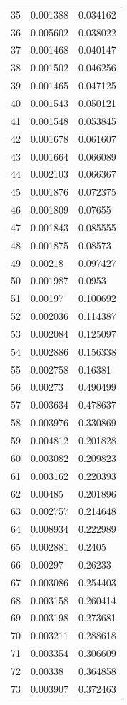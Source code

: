 \documentclass[runningheads]{llncs}
\begin{document}
\begin{longtable}{| p{} | p{} | p{} |}
35 & 0.001388 & 0.034162 \\
36 & 0.005602 & 0.038022 \\
37 & 0.001468 & 0.040147 \\
38 & 0.001502 & 0.046256 \\
39 & 0.001465 & 0.047125 \\
40 & 0.001543 & 0.050121 \\
41 & 0.001548 & 0.053845 \\
42 & 0.001678 & 0.061607 \\
43 & 0.001664 & 0.066089 \\
44 & 0.002103 & 0.066367 \\
45 & 0.001876 & 0.072375 \\
46 & 0.001809 & 0.07655 \\
47 & 0.001843 & 0.085555 \\
48 & 0.001875 & 0.08573 \\
49 & 0.00218 & 0.097427 \\
50 & 0.001987 & 0.0953 \\
51 & 0.00197 & 0.100692 \\
52 & 0.002036 & 0.114387 \\
53 & 0.002084 & 0.125097 \\
54 & 0.002886 & 0.156338 \\
55 & 0.002758 & 0.16381 \\
56 & 0.00273 & 0.490499 \\
57 & 0.003634 & 0.478637 \\
58 & 0.003976 & 0.330869 \\
59 & 0.004812 & 0.201828 \\
60 & 0.003082 & 0.209823 \\
61 & 0.003162 & 0.220393 \\
62 & 0.00485 & 0.201896 \\
63 & 0.002757 & 0.214648 \\
64 & 0.008934 & 0.222989 \\
65 & 0.002881 & 0.2405 \\
66 & 0.00297 & 0.26233 \\
67 & 0.003086 & 0.254403 \\
68 & 0.003158 & 0.260414 \\
69 & 0.003198 & 0.273681 \\
70 & 0.003211 & 0.288618 \\
71 & 0.003354 & 0.306609 \\
72 & 0.00338 & 0.364858 \\
73 & 0.003907 & 0.372463 \\

\end{longtable}
\end{document}
